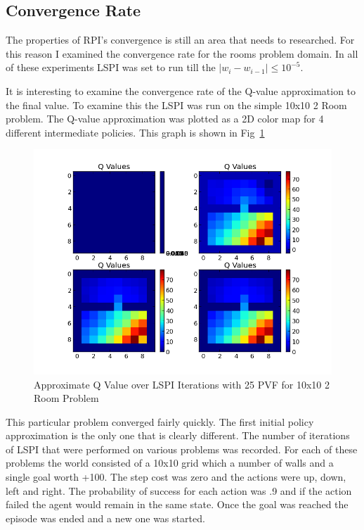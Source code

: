 \documentclass[12pt, letterpaper, final]{report}
\begin{document}
\subsection*{Convergence Rate}


The properties of RPI's convergence is still an area that needs to
researched. \cite{sridhar_mahadevan_representation_????} For this reason I examined the convergence rate for the
rooms problem domain. In all of these experiments
LSPI was set to run till the $|w_{i}-w_{i-1}| \le 10^{-5}$.

It is interesting to examine the convergence rate of the
Q-value approximation to the final value. To examine this the LSPI was
run on the simple 10x10 2 Room problem. The Q-value approximation was
plotted as a 2D color map for 4 different intermediate policies. This
graph is shown in Fig~\ref{Qconvergence1}

\FloatBarrier
\begin{figure}[h!]
\centering
\includegraphics[scale=.5]{images/debugging1.png}
\caption{Approximate Q Value over LSPI Iterations with 25 PVF for
  10x10 2 Room Problem}
\label{Qconvergence1}
\end{figure}
\FloatBarrier

This particular problem converged fairly quickly. The first initial
policy approximation is the only one that is clearly different. The
number of iterations of LSPI that were performed on various problems
was recorded. For each of these problems the world consisted of a
10x10 grid which a number of walls and a single goal worth +100. The
step cost was zero and the actions were up, down, left and right. The
probability of success for each action was .9 and if the action failed
the agent would remain in the same state. Once the goal was reached
the episode was ended and a new one was started.
\end{document}

